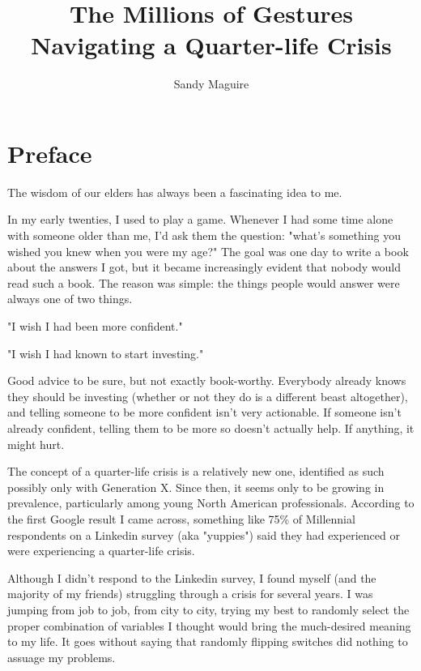 \documentclass[]{book}
\title{\textbf{\LARGE The Millions of Gestures}\\{\Large Navigating a
Quarter-life Crisis}}
\author{Sandy Maguire}
\date{}
\begin{document}
\frontmatter
\maketitle

\tableofcontents

\linenumbers

\chapter*{Preface}

The wisdom of our elders has always been a fascinating idea to me.

In my early twenties, I used to play a game. Whenever I had some time alone with
someone older than me, I'd ask them the question: "what's something you wished
you knew when you were my age?" The goal was one day to write a book about the
answers I got, but it became increasingly evident that nobody would read such a
book. The reason was simple: the things people would answer were always one of
two things.

"I wish I had been more confident."

"I wish I had known to start investing."

Good advice to be sure, but not exactly book-worthy. Everybody already knows
they should be investing (whether or not they do is a different beast
altogether), and telling someone to be more confident isn't very actionable. If
someone isn't already confident, telling them to be more so doesn't actually
help. If anything, it might hurt.

 The concept of a quarter-life crisis is a relatively
new one, identified as such possibly only with Generation X. Since then, it
seems only to be growing in prevalence, particularly among young North American
professionals. According to the first Google result I came across, something
like 75\% of Millennial respondents on a Linkedin survey (aka "yuppies") said
they had experienced or were experiencing a quarter-life crisis.

Although I didn't respond to the Linkedin survey, I found myself (and the
majority of my friends) struggling through a crisis for several years. I was
jumping from job to job, from city to city, trying my best to randomly select
the proper combination of variables I thought would bring the much-desired
meaning to my life. It goes without saying that randomly flipping switches did
nothing to assuage my problems.
\end{document}
